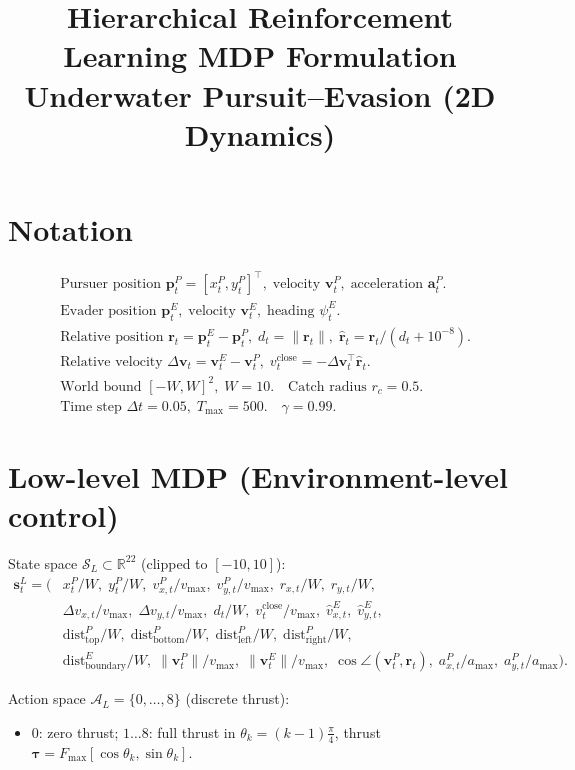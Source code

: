 \documentclass[11pt]{article}
\title{Hierarchical Reinforcement Learning MDP Formulation\\Underwater Pursuit--Evasion (2D Dynamics)}
\author{ }
\date{ }
\begin{document}
\maketitle

\section{Notation}
\begin{align*}
&\text{Pursuer position } \bm{p}^P_t=[x^P_t,y^P_t]^\top,\; \text{velocity } \bm{v}^P_t,\; \text{acceleration } \bm{a}^P_t.\\
&\text{Evader position } \bm{p}^E_t,\; \text{velocity } \bm{v}^E_t,\; \text{heading } \psi^E_t.\\
&\text{Relative position } \bm{r}_t=\bm{p}^E_t-\bm{p}^P_t,\; d_t=\|\bm{r}_t\|,\; \hat{\bm{r}}_t=\bm{r}_t/(d_t+10^{-8}).\\
&\text{Relative velocity } \Delta\bm{v}_t=\bm{v}^E_t-\bm{v}^P_t,\; v^{\text{close}}_t=-\Delta\bm{v}_t^\top\hat{\bm{r}}_t.\\
&\text{World bound } [-W,W]^2,\; W=10.\quad \text{Catch radius } r_c=0.5.\\
&\text{Time step } \Delta t=0.05,\; T_{\max}=500.\quad \gamma=0.99.
\end{align*}

\section{Low-level MDP (Environment-level control)}
State space $\mathcal{S}_L\subset\mathbb{R}^{22}$ (clipped to $[-10,10]$):
\begin{align*}
\bm{s}^L_t = (&x^P_t/W,\; y^P_t/W,\; v^P_{x,t}/v_{\max},\; v^P_{y,t}/v_{\max},\; r_{x,t}/W,\; r_{y,t}/W,\\
&\Delta v_{x,t}/v_{\max},\; \Delta v_{y,t}/v_{\max},\; d_t/W,\; v^{\text{close}}_t/v_{\max},\; \hat{v}^E_{x,t},\; \hat{v}^E_{y,t},\\
&\text{dist}^{P}_{\text{top}}/W,\; \text{dist}^{P}_{\text{bottom}}/W,\; \text{dist}^{P}_{\text{left}}/W,\; \text{dist}^{P}_{\text{right}}/W,\\
&\text{dist}^{E}_{\text{boundary}}/W,\; \|\bm{v}^P_t\|/v_{\max},\; \|\bm{v}^E_t\|/v_{\max},\; \cos\angle(\bm{v}^P_t,\bm{r}_t),\; a^P_{x,t}/a_{\max},\; a^P_{y,t}/a_{\max}).
\end{align*}

Action space $\mathcal{A}_L=\{0,\dots,8\}$ (discrete thrust):
\begin{itemize}
  \item $0$: zero thrust; $1\dots 8$: full thrust in $\theta_k = (k-1)\tfrac{\pi}{4}$, thrust $\bm{\tau}=F_{\max}[\cos\theta_k,\sin\theta_k]$.
\end{itemize}
\end{document}
